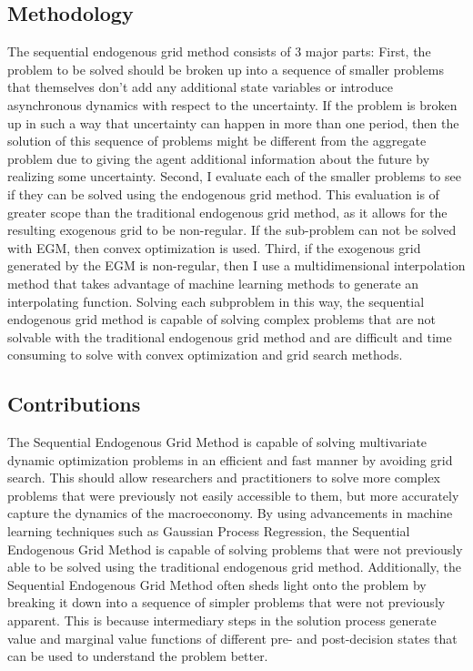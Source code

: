 \documentclass[\econtexRoot/SequentialEGM]{subfiles}
\begin{document}
\subsection{Methodology} %

The sequential endogenous grid method consists of 3 major parts: First, the problem to be solved should be broken up into a sequence of smaller problems that themselves don't add any additional state variables or introduce asynchronous dynamics with respect to the uncertainty. If the problem is broken up in such a way that uncertainty can happen in more than one period, then the solution of this sequence of problems might be different from the aggregate problem due to giving the agent additional information about the future by realizing some uncertainty. Second, I evaluate each of the smaller problems to see if they can be solved using the endogenous grid method. This evaluation is of greater scope than the traditional endogenous grid method, as it allows for the resulting exogenous grid to be non-regular. If the sub-problem can not be solved with EGM, then convex optimization is used. Third, if the exogenous grid generated by the EGM is non-regular, then I use a multidimensional interpolation method that takes advantage of machine learning methods to generate an interpolating function. Solving each subproblem in this way, the sequential endogenous grid method is capable of solving complex problems that are not solvable with the traditional endogenous grid method and are difficult and time consuming to solve with convex optimization and grid search methods.

\subsection{Contributions} %


The Sequential Endogenous Grid Method is capable of solving multivariate dynamic optimization problems in an efficient and fast manner by avoiding grid search. This should allow researchers and practitioners to solve more complex problems that were previously not easily accessible to them, but more accurately capture the dynamics of the macroeconomy. By using advancements in machine learning techniques such as Gaussian Process Regression, the Sequential Endogenous Grid Method is capable of solving problems that were not previously able to be solved using the traditional endogenous grid method. Additionally, the Sequential Endogenous Grid Method often sheds light onto the problem by breaking it down into a sequence of simpler problems that were not previously apparent. This is because intermediary steps in the solution process generate value and marginal value functions of different pre- and post-decision states that can be used to understand the problem better.
\end{document}
